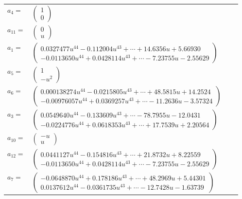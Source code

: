 \documentclass[1p]{elsarticle_modified}
\theoremstyle{definition}
\begin{document}
\begin{tabular}{m{7pt} m{180pt} m{7pt} m{180pt} }
\flushright $a_{4}=$&$\begin{pmatrix}1\\0\end{pmatrix}$ \\
\flushright $a_{11}=$&$\begin{pmatrix}0\\u\end{pmatrix}$ \\
\flushright $a_{1}=$&$\begin{pmatrix}0.0327477 u^{44}-0.112004 u^{43}+\cdots+14.6356 u+5.66930\\-0.0113650 u^{44}+0.0428114 u^{43}+\cdots-7.23755 u-2.55629\end{pmatrix}$ \\
\flushright $a_{5}=$&$\begin{pmatrix}1\\- u^2\end{pmatrix}$ \\
\flushright $a_{6}=$&$\begin{pmatrix}0.000138274 u^{44}-0.0215805 u^{43}+\cdots+48.5815 u+14.2524\\-0.00976057 u^{44}+0.0369257 u^{43}+\cdots-11.2636 u-3.57324\end{pmatrix}$ \\
\flushright $a_{3}=$&$\begin{pmatrix}0.0549640 u^{44}-0.133609 u^{43}+\cdots-78.7955 u-12.0431\\-0.0224776 u^{44}+0.0618353 u^{43}+\cdots+17.7539 u+2.20564\end{pmatrix}$ \\
\flushright $a_{10}=$&$\begin{pmatrix}- u\\u\end{pmatrix}$ \\
\flushright $a_{12}=$&$\begin{pmatrix}0.0441127 u^{44}-0.154816 u^{43}+\cdots+21.8732 u+8.22559\\-0.0113650 u^{44}+0.0428114 u^{43}+\cdots-7.23755 u-2.55629\end{pmatrix}$ \\
\flushright $a_{7}=$&$\begin{pmatrix}-0.0648870 u^{44}+0.178186 u^{43}+\cdots+48.2969 u+5.44301\\0.0137612 u^{44}-0.0361735 u^{43}+\cdots-12.7428 u-1.63739\end{pmatrix}$ \\

\end{tabular}
\end{document}
